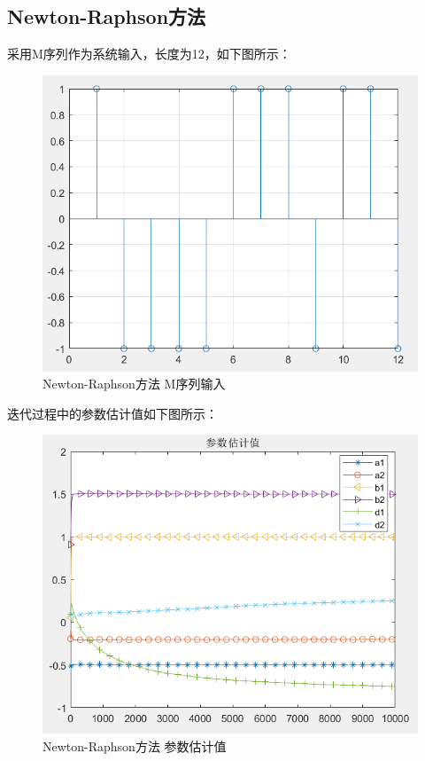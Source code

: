 \documentclass[UTF8]{article}
\begin{document}
\subsection{Newton-Raphson方法}
采用M序列作为系统输入，长度为12，如下图所示：
\begin{figure}[H]
    \centering %
    \includegraphics[width=.8\textwidth]{figure/newton_M序列输入.png} 
    \caption{Newton-Raphson方法 M序列输入} %
\end{figure}

迭代过程中的参数估计值如下图所示：
\begin{figure}[H]
    \centering %
    \includegraphics[width=.8\textwidth]{figure/newton_参数估计值.png} 
    \caption{Newton-Raphson方法 参数估计值} %
\end{figure}
\end{document}
